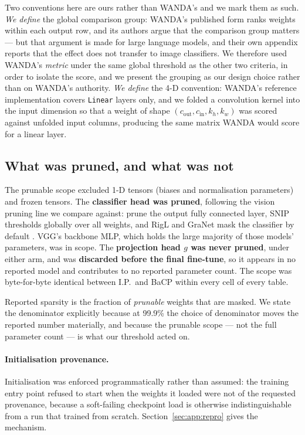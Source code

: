 Two conventions here are ours rather than WANDA's and we mark them as such.
\emph{We define} the global comparison group: WANDA's published form ranks
weights within each output row, and its authors argue that the comparison group
matters --- but that argument is made for large language models, and their own
appendix reports that the effect does not transfer to image classifiers. We
therefore used WANDA's \emph{metric} under the same global threshold as the other
two criteria, in order to isolate the score, and we present the grouping as our
design choice rather than on WANDA's authority. \emph{We define} the 4-D
convention: WANDA's reference implementation covers \texttt{Linear} layers only,
and we folded a convolution kernel into the input dimension so that a weight of
shape $(c_{\mathrm{out}}, c_{\mathrm{in}}, k_h, k_w)$ was scored against unfolded
input columns, producing the same matrix WANDA would score for a linear layer.

\subsection{What was pruned, and what was not}

The prunable scope excluded 1-D tensors (biases and normalisation parameters) and
frozen tensors. The \textbf{classifier head was pruned}, following the vision
pruning line we compare against: \citet{han2015learning} prune the output fully
connected layer, SNIP thresholds globally over all weights, and RigL and GraNet
mask the classifier by default \citep{evci2020rigl,liu2021granet}. VGG's backbone
MLP, which holds the large majority of those models' parameters, was in scope.
The \textbf{projection head $g$ was never pruned}, under either arm, and was
\textbf{discarded before the final fine-tune}, so it appears in no reported model
and contributes to no reported parameter count. The scope was byte-for-byte
identical between I.P.\ and BaCP within every cell of every table.

Reported sparsity is the fraction of \emph{prunable} weights that are masked. We
state the denominator explicitly because at 99.9\% the choice of denominator
moves the reported number materially, and because the prunable scope --- not the
full parameter count --- is what our threshold acted on.

\paragraph{Initialisation provenance.}
Initialisation was enforced programmatically rather than assumed: the training
entry point refused to start when the weights it loaded were not of the requested
provenance, because a soft-failing checkpoint load is otherwise
indistinguishable from a run that trained from scratch. Section~\ref{sec:app:repro}
gives the mechanism.

